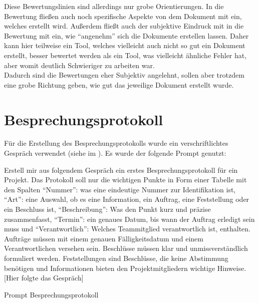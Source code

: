 Diese Bewertungslinien sind allerdings nur grobe Orientierungen. In die Bewertung fließen auch noch spezifische 
Aspekte von dem Dokument mit ein, welches erstellt wird. Außerdem fließt auch der subjektive Eindruck mit in die 
Bewertung mit ein, wie ``angenehm'' sich die Dokumente erstellen lassen. Daher kann hier teilweise ein Tool, welches 
vielleicht auch nicht so gut ein Dokument erstellt, besser bewertet werden als ein Tool, was vielleicht ähnliche 
Fehler hat, aber womit deutlich Schwieriger zu arbeiten war.\\
Dadurch sind die Bewertungen eher Subjektiv angelehnt, sollen aber trotzdem eine grobe Richtung geben, wie gut das 
jeweilige Dokument erstellt wurde.


\section{Besprechungsprotokoll}  \label{CompBesprechungsprotokoll}

Für die Erstellung des Besprechungsprotokolls wurde ein verschriftlichtes Gespräch verwendet 
(siehe  im ). Es wurde der folgende Prompt 
genutzt:

\begin{prompt}[H]
    \begin{tcolorbox}[colback=gray!20, colframe=gray!20, boxrule=0pt, sharp corners] 
        Erstell mir aus folgendem Gespräch ein erstes Besprechungsprotokoll für ein Projekt. Das Protokoll soll nur 
        die wichtigen Punkte in Form einer Tabelle mit den Spalten ``Nummer'': was eine eindeutige Nummer zur 
        Identifikation ist, ``Art'': eine Auswahl, ob es eine Information, ein Auftrag, eine Feststellung oder ein 
        Beschluss ist, ``Beschreibung'': Was den Punkt kurz und präzise zusammenfasst, ``Termin'': ein genaues Datum, bis 
        wann der Auftrag erledigt sein muss und ``Verantwortlich'': Welches Teammitglied verantwortlich ist, enthalten. 
        Aufträge müssen mit einem genauen Fälligkeitsdatum und einem Verantwortlichen versehen sein. Beschlüsse 
        müssen klar und unmissverständlich formuliert werden. Feststellungen sind Beschlüsse, die keine Abstimmung 
        benötigen und Informationen bieten den Projektmitgliedern wichtige Hinweise. 
        [Hier folgte das Gespräch]
        \vfill
    \end{tcolorbox}
    \caption{Prompt Besprechungsprotokoll}
    \label{Prompt Besprechungsprotokoll}
\end{prompt}

